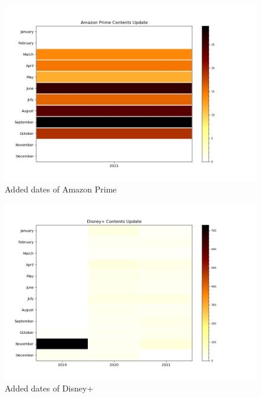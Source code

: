 \documentclass{article}
\begin{document}
\begin{figure}[!htb]
	\centering
	\includegraphics[scale=0.3]{../contents_update/Amazon Prime_contents_update.png}
	\caption{Added dates of Amazon Prime}
	\label{fig:added_dates_amazon_prime}
\end{figure}
\begin{figure}[!htb]
	\centering
	\includegraphics[scale=0.3]{../contents_update/Disney+_contents_update.png}
	\caption{Added dates of Disney+}
	\label{fig:added_dates_disney_plus}
\end{figure}
\end{document}
